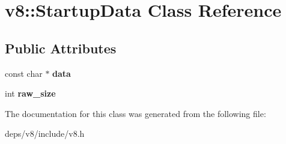 \hypertarget{classv8_1_1_startup_data}{}\section{v8\+:\+:Startup\+Data Class Reference}
\label{classv8_1_1_startup_data}
\subsection*{Public Attributes}
\begin{DoxyCompactItemize}
\item 
\hypertarget{classv8_1_1_startup_data_a8daf0c5282d7c465988757dc4ecda1af}{}const char $\ast$ {\bfseries data}\label{classv8_1_1_startup_data_a8daf0c5282d7c465988757dc4ecda1af}

\item 
\hypertarget{classv8_1_1_startup_data_a2f797e167b2bebd18ddca83dedda6ffa}{}int {\bfseries raw\+\_\+size}\label{classv8_1_1_startup_data_a2f797e167b2bebd18ddca83dedda6ffa}

\end{DoxyCompactItemize}


The documentation for this class was generated from the following file\+:\begin{DoxyCompactItemize}
\item 
deps/v8/include/v8.\+h\end{DoxyCompactItemize}
